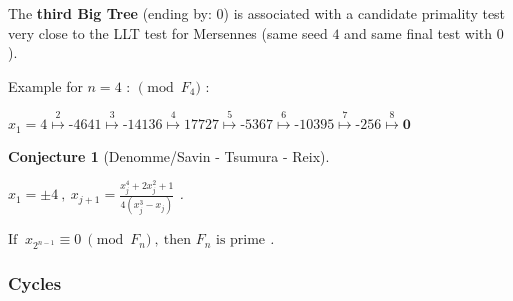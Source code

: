 \documentclass[latin1]{quadrature}
\newcommand{\PMod}[1]{\!\!\pmod{#1}}
\newtheorem{conjecture}{Conjecture}
\newif\ifenfrancais
\begin{document}
\begin{article}
\begin{article}
\vspace{.1in}

\ifenfrancais
Le \textbf{troisi\`eme Arbre G\'eant} (finissant par : $0$) est associ\'e \`a un test candidat de primalit\'e tr\`es proche du test LLT pour les nombres de Mersenne (m\^eme graine $4$ et m\^eme test final avec $0$).
\else
The \textbf{third Big Tree} (ending by: $0$) is associated with a candidate primality test very close to the LLT test for Mersennes (same seed $4$ and same final test with $0$).
\fi

\ifenfrancais
Example pour $n=4$ : $\PMod{F_{4}}$ :
\else
Example for $n=4$ : $\PMod{F_{4}}$ :
\fi

$x_1 = 4
\stackrel{2}{\mapsto} \text{-4641}
\stackrel{3}{\mapsto} \text{-14136}
\stackrel{4}{\mapsto} \text{17727}
\stackrel{5}{\mapsto} \text{-5367}
\stackrel{6}{\mapsto} \text{-10395}
\stackrel{7}{\mapsto} \text{-256}
\stackrel{8}{\mapsto} \textbf{0}$

\vspace{.05in}

\ifenfrancais
\begin{conjecture}[Denomme/Savin - Tsumura - Reix]
\ 
\vspace{.04in}

$x_1=\pm 4 \ , \   x_{j+1} = \frac{\displaystyle x_j^4+2x_j^2+1}{\displaystyle 4(x_j^3-x_j)}$ .

\vspace{.05in}
$\text{Si } \ x_{2^{n-1}} \equiv 0 \ \pmod{F_n} \ , \ \text{ alors } F_n  \text{ est premier} $ .
\end{conjecture}
\else
\begin{conjecture}[Denomme/Savin - Tsumura - Reix]
\ 
\vspace{.04in}

$x_1=\pm 4 \ , \   x_{j+1} = \frac{\displaystyle x_j^4+2x_j^2+1}{\displaystyle 4(x_j^3-x_j)}$ .

\vspace{.05in}
$\text{If } \ x_{2^{n-1}} \equiv 0 \ \pmod{F_n} \ , \ \text{then } F_n  \text{ is prime} $ .
\end{conjecture}
\fi

%


\subsubsection { Cycles }



\end{article}
\end{article}
\end{document}

